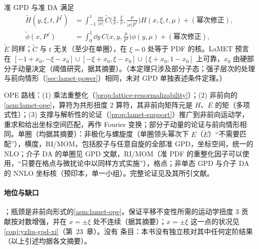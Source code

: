 \begin{theorem}\label{thm:lamet-quasi-gpd}
准 GPD 与准 DA 满足
\begin{equation}\label{eq:lamet-gpd-match}
\begin{aligned}
\tilde H(y,\xi,t,\bar P^z)&=\int_{-1}^1\frac{\dd x}{|x|}\,\tilde C\Big(\frac yx,\frac\xi x,\frac\mu{|x|\bar P^z}\Big)H(x,\xi,t,\mu)+(\text{幂次修正}),\\
\tilde\phi(x,P^z)&=\int_0^1\dd y\,C\Big(x,y,\frac\mu{P^z}\Big)\phi(y,\mu)+(\text{幂次修正}),
\end{aligned}
\end{equation}
$\tilde E$ 同样；$\tilde C$ 与 $t$ 无关（至少在单圈），在 $\xi=0$ 处等于 PDF 的核。LaMET 预言在 $[-1+x_0,-\xi-x_0]\cup[-\xi+x_0,\xi-x_0]\cup[\xi+x_0,1-x_0]$ 上可靠，$x_0$ 由硬部分子动量决定\cite{Holligan:2025baj}（阈值研究，据其摘要）。（本定理只涉及部分子态；强子层次的处理与前向情形（\cref{sec:lamet-power}）相同，未对 GPD 单独表述条件定理。）
\end{theorem}

\begin{proofsketch}
OPE 路线：(1) 乘法重整化（\cref{prop:lattice-renormalizability}）；(2) 非前向的\cref{asm:lamet-ope}，算符为共形扭度 2 算符，其非前向矩阵元是 $H$、$E$ 的矩（多项式性）；(3) 支撑与解析性的论证（\cref{prop:lamet-support}）推广到非前向运动学，重求和给出坐标空间匹配，再作 Fourier 变换；部分子动量的论证与前向情形相同。单圈（均据其摘要）：非极化与螺旋度\cite{Ji:2015qla}（单圈领头幂次下 $E$（$\tilde E$）“不需要匹配”），横度\cite{Xiong:2015nua}，RI/MOM\cite{Liu:2019urm}，包括胶子与任意自旋的全部准 GPD\cite{Ma:2022ggj}，坐标空间\cite{Radyushkin:2019owq}，统一的 NLO\cite{Yao:2022vtp}；介子 DA 的单圈见 GPD 文献，RI/MOM\cite{Liu:2018tox}（准 PDF 的重整化因子可以使用，“只要在格点与微扰论中以同样方式实施”），格点\cite{Zhang:2017bzy,LatticeParton:2022zqc,Holligan:2023rex}；非单态 GPD 与介子 DA 的 NNLO 坐标核\cite{Ji:2025mvk}（预印本，单一小组）。完整论证见\cite{JiEtAl2021}及其所引文献。
\end{proofsketch}

\paragraph{地位与缺口}
\tagA；瓶颈是非前向形式的\cref{asm:lamet-ope}。保证平移不变性所需的运动学扭度 3 贡献按对数增强，并在 $x=\pm\xi$ 处不连续\cite{Braun:2023alc}（据其摘要）；$x=\pm\xi$ 这一点的状况见\cref{conj:yzliu-gpd-xi}（第~23~章）。没有 \tagR 条目：本书没有独立核对其中任何定阶结果（以上引述均据各文摘要）。

